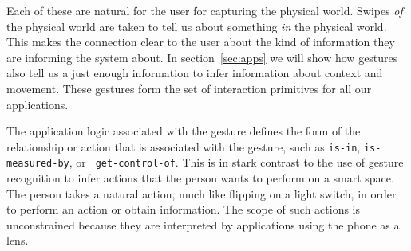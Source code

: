 Each of these are natural for the user for capturing the physical world.  Swipes \emph{of}
the physical world are taken to tell us about something \emph{in} the physical world.  This makes the connection
clear to the user about the kind of information they are informing the system about.  In section~\ref{sec:apps}
we will show how gestures also tell us a just enough information to infer information about context and movement.
These gestures form the set of interaction primitives for all our
applications.  

The application logic associated with the gesture
defines the form of the relationship or action that is associated with the
gesture, such as {\tt is-in}, {\tt is-measured-by}, or {\tt
  get-control-of}.  This is in stark contrast to the use of gesture
recognition to infer actions that the person wants to perform on a
smart space.  The person takes a natural action, much like flipping on
a light switch, in order to perform an action or obtain information.
The scope of such actions is unconstrained because they are
interpreted by applications using the phone as a lens.


